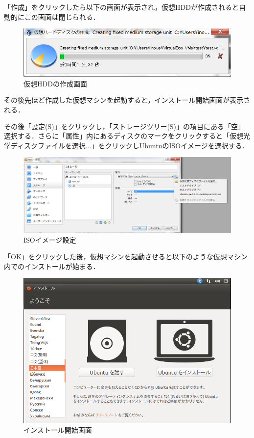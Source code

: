「作成」をクリックしたら以下の画面が表示され，仮想HDDが作成されると自動的にこの画面は閉じられる．


\begin{figure}[H]
\centering
\includegraphics[width=15cm]{vb005.png}
\caption{仮想HDDの作成画面}\label{仮想マシンの設定画面}
\end{figure}

\clearpage


その後先ほど作成した仮想マシンを起動すると，インストール開始画面が表示される．

その後「設定(S)」をクリックし，「ストレージツリー(S)」の項目にある「空」選択する．さらに「属性」内にあるディスクのマークをクリックすると「仮想光学ディスクファイルを選択...」をクリックしUbuntuのISOイメージを選択する．

\begin{figure}[H]
\centering
\includegraphics[width=15cm]{vb006.png}
\caption{ISOイメージ設定}\label{仮想マシンの設定画面}
\end{figure}

「OK」をクリックした後，仮想マシンを起動させると以下のような仮想マシン内でのインストールが始まる．

\begin{figure}[H]
\centering
\includegraphics[width=15cm]{ubuntuinstall00.png}
\caption{インストール開始画面}\label{インストール開始画面}
\end{figure}

